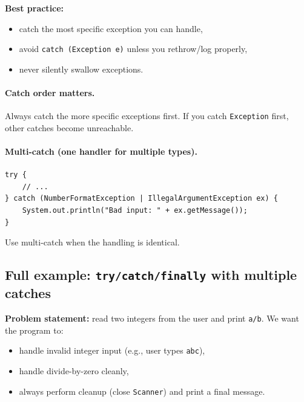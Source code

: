 \documentclass[11pt]{article}
\begin{document}
\textbf{Best practice:}
\begin{itemize}
  \item catch the most specific exception you can handle,
  \item avoid \texttt{catch (Exception e)} unless you rethrow/log properly,
  \item never silently swallow exceptions.
\end{itemize}

\paragraph{Catch order matters.}
Always catch the more specific exceptions first. If you catch \texttt{Exception} first, other catches become unreachable.

\paragraph{Multi-catch (one handler for multiple types).}
\begin{lstlisting}
try {
    // ...
} catch (NumberFormatException | IllegalArgumentException ex) {
    System.out.println("Bad input: " + ex.getMessage());
}
\end{lstlisting}
Use multi-catch when the handling is identical.

\subsection{Full example: \texttt{try/catch/finally} with multiple catches}
\textbf{Problem statement:} read two integers from the user and print \texttt{a/b}.
We want the program to:
\begin{itemize}
  \item handle invalid integer input (e.g., user types \texttt{abc}),
  \item handle divide-by-zero cleanly,
  \item always perform cleanup (close \texttt{Scanner}) and print a final message.
\end{itemize}
\end{document}
